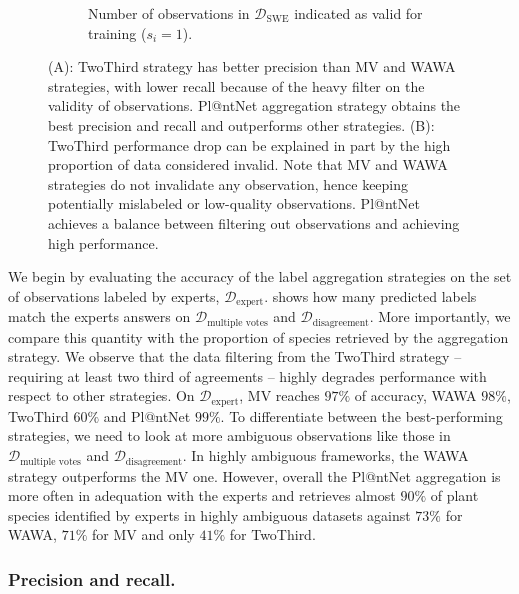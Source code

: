 \begin{figure}[htb]
\begin{subfigure}[t]{.48\textwidth}
    \caption{Number of observations in $\mathcal{D}_{\mathrm{SWE}}$ indicated as valid for training ($s_i=1$). }
    \label{fig:vol_train_data}    \end{subfigure}
    \caption{(A): TwoThird strategy has better precision than MV and WAWA strategies, with lower recall because of the heavy filter on the validity of observations. Pl@ntNet aggregation strategy obtains the best precision and recall and outperforms other strategies. (B): TwoThird performance drop can be explained in part by the high proportion of data considered invalid. Note that MV and WAWA strategies do not invalidate any observation, hence keeping potentially mislabeled or low-quality observations. Pl@ntNet achieves a balance between filtering out observations and achieving high performance.}
    \label{fig:precision-volume}
\end{figure}

We begin by evaluating the accuracy of the label aggregation strategies on the set of observations labeled by experts, $\mathcal{D}_\text{expert}$.  shows how many predicted labels match the experts answers on $\mathcal{D}_{\text{multiple votes}}$ and $\mathcal{D}_{\text{disagreement}}$.
More importantly, we compare this quantity with the proportion of species retrieved by the aggregation strategy.
We observe that the data filtering from the TwoThird strategy -- requiring at least two third of agreements -- highly degrades performance with respect to other strategies.
On $\mathcal{D}_{\text{expert}}$, MV reaches $97\%$ of accuracy, WAWA $98\%$, TwoThird $60\%$ and Pl@ntNet $99\%$.
To differentiate between the best-performing strategies, we need to look at more ambiguous observations like those in $\mathcal{D}_{\text{multiple votes}}$ and $\mathcal{D}_{\text{disagreement}}$.
In highly ambiguous frameworks, the WAWA strategy outperforms the MV one.
However, overall the Pl@ntNet aggregation is more often in adequation with the experts and retrieves almost $90\%$ of plant species identified by experts in highly ambiguous datasets against $73\%$ for WAWA, $71\%$ for MV and only $41\%$ for TwoThird.

\subsubsection{Precision and recall.}

